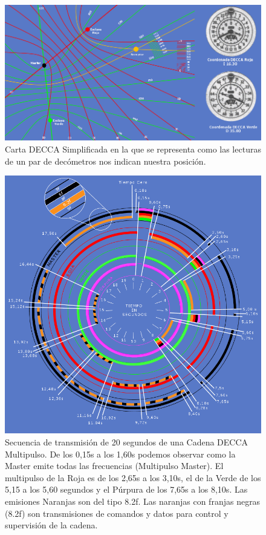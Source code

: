 \begin{figure}[!htb]
  \centering
  \includegraphics[width=\textwidth]{Imagenes/06.01.adf/DECCA-carta-simplificada.gif}  
  \caption{
Carta DECCA Simplificada en la que se representa como las lecturas de un par de dec\'ometros nos indican nuestra posici\'on.
}
  \label{fig:Decca-carta-simplificada}
\end{figure}


\begin{figure}[!htb]
  \centering
  \includegraphics[width=\textwidth]{Imagenes/06.01.adf/DECCA-secuencia-transmision.gif}  
  \caption{Secuencia de transmisi\'on de 20 segundos de una Cadena DECCA Multipulso. De los 0,15s a los 1,60s podemos observar como la Master emite todas las frecuencias (Multipulso Master). El multipulso de la Roja es de los 2,65s a los 3,10s, el de la Verde de los 5,15 a los 5,60 segundos y el P\'urpura de los 7,65s a los 8,10s. Las emisiones Naranjas son del tipo 8.2f. Las naranjas con franjas negras (8.2f) son transmisiones de comandos y datos para control y supervisi\'on de la cadena. }
  \label{fig:DECCA-secuencia-transmision}
\end{figure}

